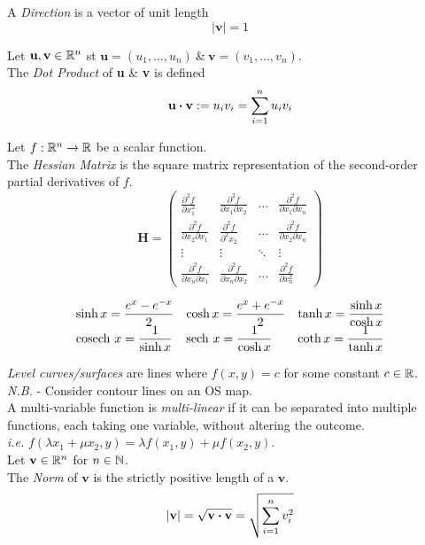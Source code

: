 \documentclass[11pt,a4paper]{article}
\begin{document}
A \textit{Direction} is a vector of unit length
$$|\textbf{v}|=1$$

Let $\textbf{u}, \textbf{v} \in\mathbb{R}^n$ st $\textbf{u} = (u_1, \dots, u_n)\ \&\ \textbf{v}=(v_1, \dots, v_n)$.\\
The \textit{Dot Product} of \textbf{u} \& \textbf{v} is defined
$$\textbf{u}\boldsymbol{\cdot}\textbf{v}:=u_iv_i=\sum_{i=1}^nu_iv_i$$

Let $f : \mathbb{R}^n \to \mathbb{R}$ be a scalar function.\\
The \textit{Hessian Matrix} is the square matrix representation of the second-order partial derivatives of $f$.
$$\textbf{H}=\begin{pmatrix}
\frac{\partial^2 f}{\partial x_1^2} & \frac{\partial^2 f}{\partial x_1 \partial x_2} & \dots & \frac{\partial^2 f}{\partial x_1 \partial x_n}\\
\frac{\partial^2 f}{\partial x_2 \partial x_1} & \frac{\partial^2 f}{\partial^2 x_2} & \dots & \frac{\partial^2 f}{\partial x_2 \partial x_n}\\
\vdots & \vdots & \ddots & \vdots\\
\frac{\partial^2 f}{\partial x_n \partial x_1} & \frac{\partial^2 f}{\partial x_n \partial x_2} & \dots & \frac{\partial^2 f}{\partial x_n^2}
\end{pmatrix}$$

\[\begin{array}{lll}
\sinh x=\dfrac{e^x-e^{-x}}{2}&\cosh x=\dfrac{e^x+e^{-x}}{2}&\tanh x=\dfrac{\sinh x}{\cosh x}\\
\mathrm{cosech}\  x=\dfrac{1}{\sinh x}&\mathrm{sech}\  x=\dfrac{1}{\cosh x}&\coth x=\dfrac{1}{\tanh x}
\end{array}\]

\textit{Level curves/surfaces} are lines where $f(x,y)=c$ for some constant $c\in\mathbb{R}$.\\
\textit{N.B.} - Consider contour lines on an OS map.\\

A multi-variable function is \textit{multi-linear} if it can be separated into multiple functions, each taking one variable, without altering the outcome.\\
\textit{i.e.} $f(\lambda x_1 + \mu x_2, y) = \lambda f(x_1, y)+\mu f(x_2, y)$.\\

Let $\textbf{v}\in\mathbb{R}^n$ for $n\in\mathbb{N}$.\\
The \textit{Norm} of $\textbf{v}$ is the strictly positive length of a $\textbf{v}$. $$|\textbf{v}| = \sqrt{\textbf{v} \boldsymbol{\cdot} \textbf{v}} = \sqrt{\sum_{i=1}^n v_i^2}$$
\end{document}
